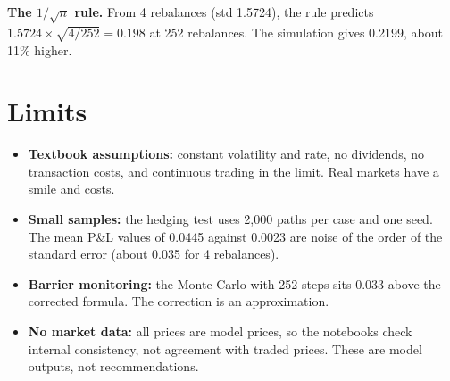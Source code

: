 \documentclass[11pt,a4paper]{article}
\begin{document}
\textbf{The $1/\sqrt n$ rule.} From 4 rebalances (std 1.5724), the rule predicts $1.5724\times\sqrt{4/252}=0.198$ at 252 rebalances. The simulation gives 0.2199, about 11\% higher.

\section{Limits}
\begin{itemize}
\item \textbf{Textbook assumptions:} constant volatility and rate, no dividends, no transaction costs, and continuous trading in the limit. Real markets have a smile and costs.
\item \textbf{Small samples:} the hedging test uses 2,000 paths per case and one seed. The mean P\&L values of 0.0445 against 0.0023 are noise of the order of the standard error (about 0.035 for 4 rebalances).
\item \textbf{Barrier monitoring:} the Monte Carlo with 252 steps sits 0.033 above the corrected formula. The correction is an approximation.
\item \textbf{No market data:} all prices are model prices, so the notebooks check internal consistency, not agreement with traded prices. These are model outputs, not recommendations.
\end{itemize}
\end{document}
